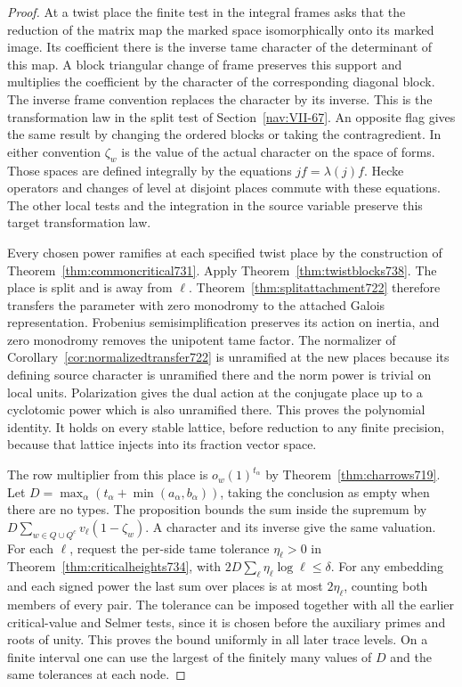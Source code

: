 \documentclass[a4paper,11pt]{article}
\theoremstyle{definition}
\theoremstyle{remark}
\numberwithin{equation}{section}
\begin{document}
\begin{proof}
At a twist place the finite test in the integral frames asks that
the reduction of the matrix map the marked space isomorphically
onto its marked image. Its coefficient there is the inverse tame
character of the determinant of this map. A block triangular
change of frame preserves this support and multiplies the
coefficient by the character of the corresponding diagonal
block. The inverse frame convention replaces the character by its
inverse. This is the transformation law in the split test of
Section~\ref{nav:VII-67}. An opposite flag gives the same result by
changing the ordered blocks or taking the contragredient. In either
convention \(\zeta_w\) is the value of the actual character on the
space of forms. Those spaces are defined integrally by the
equations \(j f=\lambda(j)f\). Hecke operators and changes of level
at disjoint places commute with these equations. The other local
tests and the integration in the source variable preserve this
target transformation law.

Every chosen power ramifies at each specified twist place by the
construction of Theorem~\ref{thm:commoncritical731}. Apply
Theorem~\ref{thm:twistblocks738}. The place is split and is away
from \(\ell\). Theorem~\ref{thm:splitattachment722} therefore
transfers the parameter with zero monodromy to the attached
Galois representation. Frobenius semisimplification preserves
its action on inertia, and zero monodromy removes the unipotent
tame factor. The normalizer of
Corollary~\ref{cor:normalizedtransfer722} is unramified at the
new places because its defining source character is unramified there
and the norm power is trivial on local units. Polarization gives
the dual action at the conjugate place up to a cyclotomic power
which is also unramified there. This proves the polynomial
identity. It holds on every stable lattice, before reduction to
any finite precision, because that lattice injects into its
fraction vector space.

The row multiplier from this place is \(o_w(1)^{t_\alpha}\) by
Theorem~\ref{thm:charrows719}. Let
\(D=\max_\alpha(t_\alpha+\min(a_\alpha,b_\alpha))\), taking the
conclusion as empty when there are no types. The proposition
bounds the sum inside the supremum by
\(D\sum_{w\in Q\cup Q^c}v_\ell(1-\zeta_w)\). A character and
its inverse give the same valuation. For each \(\ell\), request
the per-side tame tolerance \(\eta_\ell>0\) in
Theorem~\ref{thm:criticalheights734}, with
\(2D\sum_\ell\eta_\ell\log\ell\le\delta\).
For any embedding and each signed power the last sum over
places is at most \(2\eta_\ell\), counting both members of every
pair. The tolerance can be imposed together with all the earlier
critical-value and Selmer tests, since it is chosen before the
auxiliary primes and roots of unity. This proves the bound
uniformly in all later trace levels. On a finite interval one can
use the largest of the finitely many values of \(D\) and the same
tolerances at each node.
\end{proof}
\end{document}
